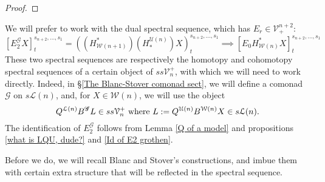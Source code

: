 \documentclass[11pt]{amsart} \renewcommand{\baselinestretch}{1.2}
\theoremstyle{plain}
\numberwithin{equation}{section} %
\theoremstyle{plain}
\numberwithin{equation}{chapter} %
\newcommand{\scrG}{\mathscr{G}}
\newcommand{\calU}{\mathcal{U}}
\newcommand{\calL}{\mathcal{L}}
\newcommand{\calV}{\mathcal{V}}
\newcommand{\calw}{\mathcal{W}}
\newcommand{\vect}[2]{\calV^{#1}_{#2}}
\newcommand{\BSW}{{\scrG}}
\newcommand{\BSWres}{B^\BSW}%
\newcommand{\E}[5]{[E^{#1}_{#2}#3]^{#4}_{#5}}
\newcommand{\Edown}[4]{[E_{#1}#2]^{#3}_{#4}}
\begin{document}
\begin{Comp funct sseqs}
\begin{proof}
\end{proof}
We will prefer to work with the dual spectral sequence, which has $E_r\in\vect{n+2}{+}$:
\[\E{\BSW}{2}{X}{s_{n+2},\ldots,s_1}{t}=((H^*_{\calw(n+1)})(H_*^{\calU(n)})X)^{s_{n+2},\ldots,s_1}_t\implies \Edown{0}{H^*_{\calw(n)}X}{s_{n+2},\ldots,s_1}{t}\]
These two spectral sequences are respectively the homotopy and cohomotopy spectral sequences of a certain object of $ss\vect{+}{n}$, with which we will need to work directly. Indeed, in \S\ref{The Blanc-Stover comonad sect}, we will define a comonad $\BSW$ on $s\calL(n)$, and, for  $X\in\calw(n)$,
we will use the object
\[Q^{\calL(n)}\BSWres L\in ss\vect{+}{n}\textup{ where } L:=Q^{\calU(n)}{ B^{\calw(n)}X}\in s\calL(n).\]
The identification of $E_2^\BSW$ follows from Lemma \ref{Q of a model} and propositions \ref{what is LQU, dude?} and \ref{Id of E2 grothen}.



Before we do, we will recall Blanc and Stover's constructions, and imbue them with certain extra structure that will be reflected in the spectral sequence.


\end{Comp funct sseqs}
\end{document}
